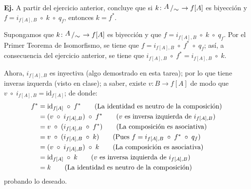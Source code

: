 \documentclass[letterpaper,DIV=14,headsepline,12pt]{scrartcl}
\makeatletter
\newcounter{Ejer}
\newcommand{\pts}{}
\newenvironment{ejercicio}[1]{\noindent
    \ifthenelse{\equal{#1}{1} \OR \equal{#1}{+1}}{\renewcommand{\pts}{\textbf{(#1 pt)}}}{\renewcommand{\pts}{\textbf{(#1 pts)}}}\textbf{Ej. \theEjer} \pts\stepcounter{Ejer}}{\vspace{.3cm}}
\newcommand{\id}{\mathrm{id}}
\newcommand{\quot}[2]{{\raisebox{.2em}{$#1$}\left/\raisebox{-.2em}{$#2$}\right.}}
\renewenvironment{proof}[1][]{%
        \par\pushQED{\qed}%
        \normalfont\topsep6pt \partopsep0pt %
        \trivlist
        \item[\hskip\labelsep
                \textbf{\textit{Demostración.}}%
        ]#1
        }{%
        \popQED\endtrivlist\@endpefalse
    }
\makeatother
\begin{document}
    \begin{ejercicio}{+1}
        A partir del ejercicio anterior, concluye que si $k\colon \quot{A}{\sim} \to f[A]$ es
        biyección y $f = i_{f[A],B} \; \circ \; k \; \circ \; q_f$, entonces $k=f^*$.
    \end{ejercicio}
    \begin{proof}
        Supongamos que $k\colon \quot{A}{\sim} \to f[A]$ es biyección y que $f = i_{f[A],B} \; \circ \; k \; \circ \; q_f$. Por el Primer Teorema de Isomorfismo, se tiene que $f = i_{f[A],B} \; \circ \; f^* \; \circ \; q_f$; así, a consecuencia del ejercicio anterior, se tiene que $i_{f[A],B} \; \circ \; f^* = i_{f[A],B} \; \circ \; k$.

        Ahora, $i_{f[A],B}$ es inyectiva (algo demostrado en esta tarea); por lo que tiene inveras izquerda (visto en clase); a saber, existe $v:B \to f[A]$ de modo que $v \; \circ \; i_{f[A],B} = \id_{f[A]}$; de donde:
        \begin{align*}
            f^* & = \id_{f[A]} \; \circ \; f^* \tag*{(La identidad es neutro de la composición)} \\
            & = (v \; \circ \; i_{f[A],B}) \; \circ \; f^* \tag*{($v$ es inversa izquierda de $i_{f[A],B}$)} \\
            & = v \; \circ \; ( i_{f[A],B} \; \circ \; f^* ) \tag*{(La composición es asociativa)} \\
            & = v \; \circ \; ( i_{f[A],B} \; \circ \; k ) \tag*{(Pues $f = i_{f[A],B} \; \circ \; f^* \; \circ \; q_f$)} \\
            & = (v \; \circ \; i_{f[A],B}) \; \circ \; k \tag*{(La composición es asociativa)} \\
            & = \id_{f[A]} \; \circ \; k \tag*{($v$ es inversa izquierda de $i_{f[A],B}$)} \\
            & = k \tag*{(La identidad es neutro de la composición)}
        \end{align*}
        probando lo deseado.
    \end{proof}
    
\end{document}

